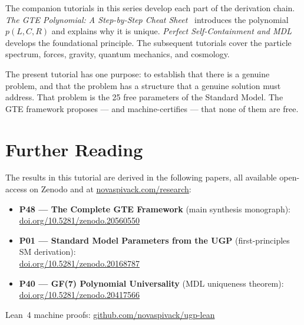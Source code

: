 \documentclass[11pt,a4paper]{article}
\begin{document}
The companion tutorials in this series develop each part of the derivation chain.
\emph{The GTE Polynomial: A Step-by-Step Cheat Sheet}~\cite{SpivackTutorialPolynomial} introduces the
polynomial $p(L,C,R)$ and explains why it is unique.
\emph{Perfect Self-Containment and MDL}~\cite{SpivackTutorialPSCMDL} develops the foundational principle.
The subsequent tutorials cover the particle spectrum, forces, gravity,
quantum mechanics, and cosmology.

The present tutorial has one purpose: to establish that there is a
genuine problem, and that the problem has a structure that a genuine
solution must address.
That problem is the 25 free parameters of the Standard Model.
The GTE framework proposes --- and machine-certifies --- that none of them
are free.

\section*{Further Reading}
\begin{tcolorbox}[colback=orange!8,colframe=orange!50!black,
  title=\textbf{Primary Sources}]
The results in this tutorial are derived in the following papers,
all available open-access on Zenodo and at
\href{https://novaspivack.com/research}{novaspivack.com/research}:
\begin{itemize}[itemsep=2pt]
  \item \textbf{P48 --- The Complete GTE Framework} (main synthesis monograph):\\
        \href{https://doi.org/10.5281/zenodo.20560550}{doi.org/10.5281/zenodo.20560550}
  \item \textbf{P01 --- Standard Model Parameters from the UGP} (first-principles SM derivation):\\
        \href{https://doi.org/10.5281/zenodo.20168787}{doi.org/10.5281/zenodo.20168787}
  \item \textbf{P40 --- GF(7) Polynomial Universality} (MDL uniqueness theorem):\\
        \href{https://doi.org/10.5281/zenodo.20417566}{doi.org/10.5281/zenodo.20417566}
\end{itemize}
Lean~4 machine proofs: \href{https://github.com/novaspivack/ugp-lean}{github.com/novaspivack/ugp-lean}
\end{tcolorbox}



\end{document}
